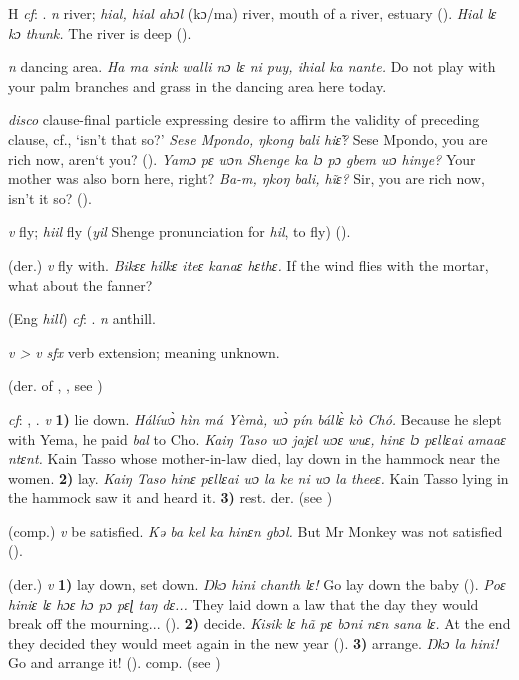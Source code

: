 \begin{letter}{H}
 \textit{cf}: . \textit{n} river; \textit{hial, hial ahɔl} (kɔ/ma) river, mouth of a river, estuary (\citealt{Pichl1967}). \textit{Hial lɛ kɔ thunk.} The river is deep (\citealt{Pichl1967}). 

 \textit{n} dancing area. \textit{Ha ma sink walli nɔ lɛ ni puy, ihial ka nante.} Do not play with your palm branches and grass in the dancing area here today.

 \textit{disco} clause-final particle expressing desire to affirm the validity of preceding clause, cf., ‘isn't that so?' \textit{Sese Mpondo, ŋkong bali hiɛ̃?} Sese Mpondo, you are rich now, aren‘t you? (\citealt{Pichl1967}). \textit{Yamɔ pɛ wɔn Shenge ka lɔ pɔ gbem wɔ hinye?} Your mother was also born here, right? \textit{Ba-m, ŋkoŋ bali, hĩɛ?} Sir, you are rich now, isn't it so? (\citealt{Pichl1967}). 

 \textit{v} fly; \textit{hiil} fly (\textit{yil} Shenge pronunciation for \textit{hil}, to fly) (\citealt{Pichl1967}).

 (der.) \textit{v} fly with. \textit{Bikɛɛ hilkɛ iteɛ kanaɛ hɛthɛ.} If the wind flies with the mortar, what about the fanner?

 (Eng \textit{hill}) \textit{cf}: . \textit{n} anthill.

 \textit{v > v} \textit{sfx} verb extension; meaning unknown.

 (der. of , , see ) 

 \textit{cf}: , . \textit{v} \textbf{1)} lie down. \textit{Hálíwɔ̀ hìn má Yèmà, wɔ̀ pín bállɛ̀ kò Chó.} Because he slept with Yema, he paid \textit{bal} to Cho. \textit{Kaiŋ Taso wɔ jajɛl wɔɛ wuɛ, hinɛ lɔ pɛllɛai amaaɛ ntɛnt.} Kain Tasso whose mother-in-law died, lay down in the hammock near the women. \textbf{2)} lay. \textit{Kaiŋ Taso hinɛ pɛllɛai wɔ la ke ni wɔ la theeɛ.} Kain Tasso lying in the hammock saw it and heard it. \textbf{3)} rest. der.  (see )

 (comp.) \textit{v} be satisfied.\textit{ Kə ba kel ka hinɛn gbɔl.} But Mr Monkey was not satisfied (\citealt{Pichl1967}).

 (der.) \textit{v} \textbf{1)} lay down, set down.\textit{ Ŋkɔ hini chanth lɛ!} Go lay down the baby (\citealt{Pichl1967}). \textit{Poɛ hiniɛ lɛ hɔɛ hɔ pɔ pɛɭ taŋ dɛ...} They laid down a law that the day they would break off the mourning... (\citealt{Sumner1921}). \textbf{2)} decide. \textit{Kisik lɛ hã pɛ bɔni nɛn sana lɛ.} At the end they decided they would meet again in the new year (\citealt{Pichl1967}). \textbf{3)} arrange. \textit{Ŋkɔ la hini!} Go and arrange it! (\citealt{Pichl1967}). comp.  (see )


\end{letter}
